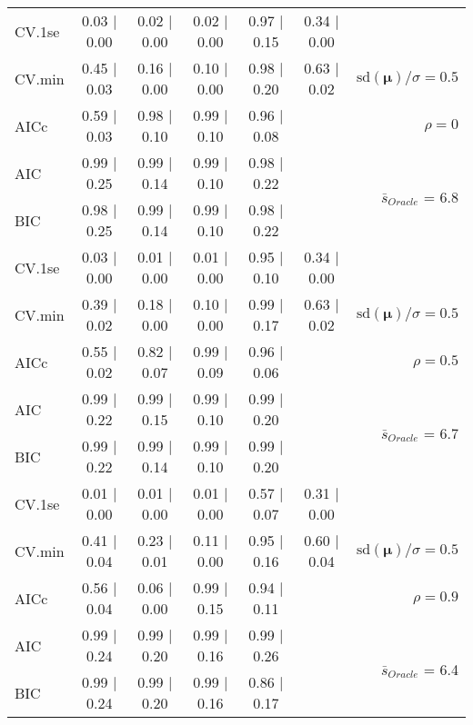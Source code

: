 \begin{table}
\begin{center}
\begin{tabular}{l*{5}{c}|r}
 \hline 
CV.1se & 0.03 $\mid$ 0.00 & 0.02 $\mid$ 0.00 & 0.02 $\mid$ 0.00 & 0.97 $\mid$ 0.15 & 0.34 $\mid$ 0.00 & \\
CV.min & 0.45 $\mid$ 0.03 & 0.16 $\mid$ 0.00 & 0.10 $\mid$ 0.00 & 0.98 $\mid$ 0.20 & 0.63 $\mid$ 0.02 &  $\mathrm{sd}(\mathbf{\mu})/\sigma=0.5$ \\
AICc & 0.59 $\mid$ 0.03 & 0.98 $\mid$ 0.10 & 0.99 $\mid$ 0.10 & 0.96 $\mid$ 0.08 & & $\rho=0$ \\
AIC & 0.99 $\mid$ 0.25 & 0.99 $\mid$ 0.14 & 0.99 $\mid$ 0.10 & 0.98 $\mid$ 0.22 & &  \multirow{2}{*}{$\bar{s}_{Oracle}$ = 6.8} \\
BIC & 0.98 $\mid$ 0.25 & 0.99 $\mid$ 0.14 & 0.99 $\mid$ 0.10 & 0.98 $\mid$ 0.22 & &  \\
 \hline 
CV.1se & 0.03 $\mid$ 0.00 & 0.01 $\mid$ 0.00 & 0.01 $\mid$ 0.00 & 0.95 $\mid$ 0.10 & 0.34 $\mid$ 0.00 & \\
CV.min & 0.39 $\mid$ 0.02 & 0.18 $\mid$ 0.00 & 0.10 $\mid$ 0.00 & 0.99 $\mid$ 0.17 & 0.63 $\mid$ 0.02 &  $\mathrm{sd}(\mathbf{\mu})/\sigma=0.5$ \\
AICc & 0.55 $\mid$ 0.02 & 0.82 $\mid$ 0.07 & 0.99 $\mid$ 0.09 & 0.96 $\mid$ 0.06 & & $\rho=0.5$ \\
AIC & 0.99 $\mid$ 0.22 & 0.99 $\mid$ 0.15 & 0.99 $\mid$ 0.10 & 0.99 $\mid$ 0.20 & &  \multirow{2}{*}{$\bar{s}_{Oracle}$ = 6.7} \\
BIC & 0.99 $\mid$ 0.22 & 0.99 $\mid$ 0.14 & 0.99 $\mid$ 0.10 & 0.99 $\mid$ 0.20 & &  \\
 \hline 
CV.1se & 0.01 $\mid$ 0.00 & 0.01 $\mid$ 0.00 & 0.01 $\mid$ 0.00 & 0.57 $\mid$ 0.07 & 0.31 $\mid$ 0.00 & \\
CV.min & 0.41 $\mid$ 0.04 & 0.23 $\mid$ 0.01 & 0.11 $\mid$ 0.00 & 0.95 $\mid$ 0.16 & 0.60 $\mid$ 0.04 &  $\mathrm{sd}(\mathbf{\mu})/\sigma=0.5$ \\
AICc & 0.56 $\mid$ 0.04 & 0.06 $\mid$ 0.00 & 0.99 $\mid$ 0.15 & 0.94 $\mid$ 0.11 & & $\rho=0.9$ \\
AIC & 0.99 $\mid$ 0.24 & 0.99 $\mid$ 0.20 & 0.99 $\mid$ 0.16 & 0.99 $\mid$ 0.26 & &  \multirow{2}{*}{$\bar{s}_{Oracle}$ = 6.4} \\
BIC & 0.99 $\mid$ 0.24 & 0.99 $\mid$ 0.20 & 0.99 $\mid$ 0.16 & 0.86 $\mid$ 0.17 & &  \\
 \hline 
\end{tabular}
\end{center}
\vspace{-1cm}
\end{table}




